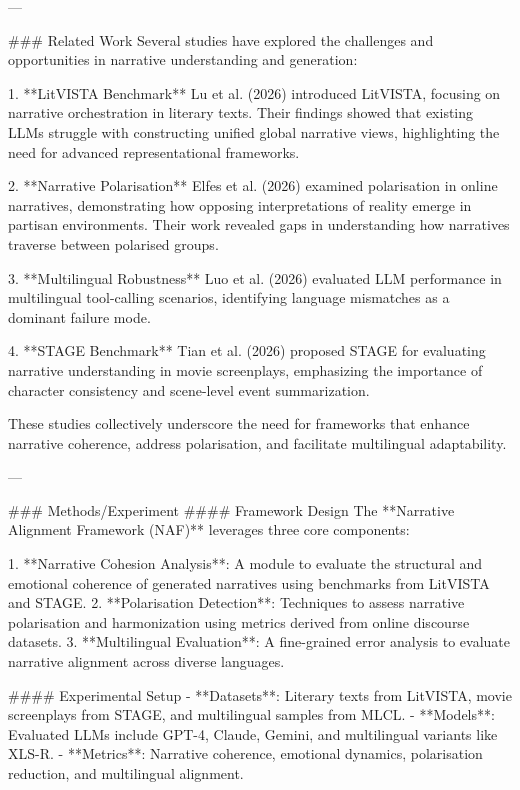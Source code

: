 ---

### Related Work  
Several studies have explored the challenges and opportunities in narrative understanding and generation:  

1. **LitVISTA Benchmark**  
Lu et al. (2026) introduced LitVISTA, focusing on narrative orchestration in literary texts. Their findings showed that existing LLMs struggle with constructing unified global narrative views, highlighting the need for advanced representational frameworks.  

2. **Narrative Polarisation**  
Elfes et al. (2026) examined polarisation in online narratives, demonstrating how opposing interpretations of reality emerge in partisan environments. Their work revealed gaps in understanding how narratives traverse between polarised groups.  

3. **Multilingual Robustness**  
Luo et al. (2026) evaluated LLM performance in multilingual tool-calling scenarios, identifying language mismatches as a dominant failure mode.  

4. **STAGE Benchmark**  
Tian et al. (2026) proposed STAGE for evaluating narrative understanding in movie screenplays, emphasizing the importance of character consistency and scene-level event summarization.

These studies collectively underscore the need for frameworks that enhance narrative coherence, address polarisation, and facilitate multilingual adaptability.

---

### Methods/Experiment  
#### Framework Design  
The **Narrative Alignment Framework (NAF)** leverages three core components:  

1. **Narrative Cohesion Analysis**: A module to evaluate the structural and emotional coherence of generated narratives using benchmarks from LitVISTA and STAGE.  
2. **Polarisation Detection**: Techniques to assess narrative polarisation and harmonization using metrics derived from online discourse datasets.  
3. **Multilingual Evaluation**: A fine-grained error analysis to evaluate narrative alignment across diverse languages.  

#### Experimental Setup  
- **Datasets**: Literary texts from LitVISTA, movie screenplays from STAGE, and multilingual samples from MLCL.  
- **Models**: Evaluated LLMs include GPT-4, Claude, Gemini, and multilingual variants like XLS-R.  
- **Metrics**: Narrative coherence, emotional dynamics, polarisation reduction, and multilingual alignment.  

